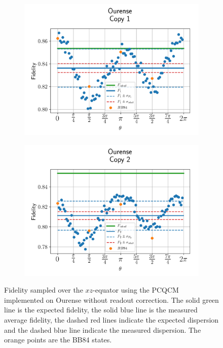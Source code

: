   
  \begin{figure}[H]
    \centering
    \begin{subfigure}{.5\textwidth}
      \centering
      \includegraphics[width=\textwidth]{Figures/PhaseCovariant/IBM/OnlyEquator/results_ourense_copy1.png}
      \label{fig:pc_uncorrected_ourense_equator_1}
    \end{subfigure}%
    \begin{subfigure}{.5\textwidth}
      \centering
      \includegraphics[width=\textwidth]{Figures/PhaseCovariant/IBM/OnlyEquator/results_ourense_copy2.png}
      \label{fig:pc_uncorrected_ourense_equator_2}
    \end{subfigure}
    \vspace{-0.5cm}
    \caption{Fidelity sampled over the $xz$-equator using the PCQCM implemented on Ourense without readout correction. The solid green line is the expected fidelity, the solid blue line is the measured average fidelity, the dashed red lines indicate the expected dispersion and the dashed blue line indicate the measured dispersion. The orange points are the BB84 states.}
    \label{fig:pc_uncorrected_ourense_equator}
  \end{figure}
  
